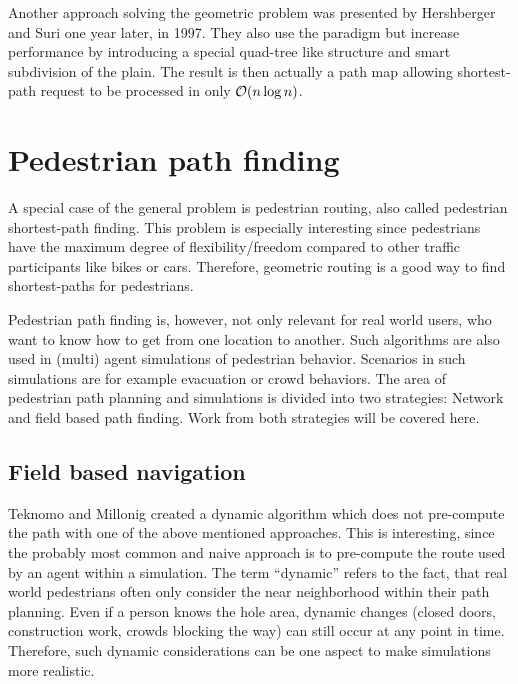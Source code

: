 	
	Another approach solving the geometric  problem was presented by Hershberger and Suri one year later, in 1997.
	They also use the  paradigm but increase performance by introducing a special quad-tree like structure and smart subdivision of the plain.
	The result is then actually a path map allowing shortest-path request to be processed in only $\mathcal{O}(n \log n)$.
	

\section{Pedestrian path finding}
	
	A special case of the general  problem is pedestrian routing, also called pedestrian shortest-path finding.
	This problem is especially interesting since pedestrians have the maximum degree of flexibility/freedom compared to other traffic participants like bikes or cars.
	Therefore, geometric routing is a good way to find shortest-paths for pedestrians.
	
	Pedestrian path finding is, however, not only relevant for real world users, who want to know how to get from one location to another.
	Such algorithms are also used in (multi) agent simulations of pedestrian behavior.
	Scenarios in such simulations are for example evacuation or crowd behaviors.
	The area of pedestrian path planning and simulations is divided into two strategies: Network and field based path finding\cite[2]{hartmann-geodesic}.
	Work from both strategies will be covered here.
	
	\subsection{Field based navigation}
		
		Teknomo and Millonig created a dynamic algorithm which does not pre-compute the path with one of the above mentioned approaches\cite{teknomo-millonig-routing}.
		This is interesting, since the probably most common and naive approach is to pre-compute the route used by an agent within a simulation.
		The term \enquote{dynamic} refers to the fact, that real world pedestrians often only consider the near neighborhood within their path planning.
		Even if a person knows the hole area, dynamic changes (closed doors, construction work, crowds blocking the way) can still occur at any point in time.
		Therefore, such dynamic considerations can be one aspect to make simulations more realistic.
		
